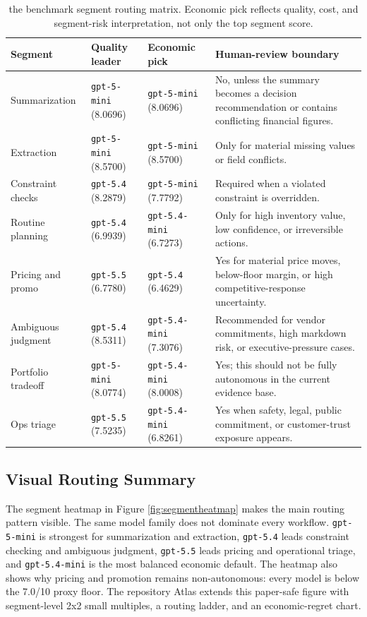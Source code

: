 \documentclass[11pt]{article}
\newcommand{\score}[1]{#1/10}
\newcommand{\code}[1]{\texttt{#1}}
\begin{document}
\begin{table}[t]
\centering
\small
\begin{tabularx}{\textwidth}{>{\raggedright\arraybackslash}p{} >{\raggedright\arraybackslash}p{} >{\raggedright\arraybackslash}p{} X}
\toprule
Segment & Quality leader & Economic pick & Human-review boundary \\
\midrule
Summarization & \code{gpt-5-mini} (8.0696) & \code{gpt-5-mini} (8.0696) & No, unless the summary becomes a decision recommendation or contains conflicting financial figures. \\
Extraction & \code{gpt-5-mini} (8.5700) & \code{gpt-5-mini} (8.5700) & Only for material missing values or field conflicts. \\
Constraint checks & \code{gpt-5.4} (8.2879) & \code{gpt-5-mini} (7.7792) & Required when a violated constraint is overridden. \\
Routine planning & \code{gpt-5.4} (6.9939) & \code{gpt-5.4-mini} (6.7273) & Only for high inventory value, low confidence, or irreversible actions. \\
Pricing and promo & \code{gpt-5.5} (6.7780) & \code{gpt-5.4} (6.4629) & Yes for material price moves, below-floor margin, or high competitive-response uncertainty. \\
Ambiguous judgment & \code{gpt-5.4} (8.5311) & \code{gpt-5.4-mini} (7.3076) & Recommended for vendor commitments, high markdown risk, or executive-pressure cases. \\
Portfolio tradeoff & \code{gpt-5-mini} (8.0774) & \code{gpt-5.4-mini} (8.0008) & Yes; this should not be fully autonomous in the current evidence base. \\
Ops triage & \code{gpt-5.5} (7.5235) & \code{gpt-5.4-mini} (6.8261) & Yes when safety, legal, public commitment, or customer-trust exposure appears. \\
\bottomrule
\end{tabularx}
\caption{the benchmark segment routing matrix. Economic pick reflects quality, cost, and segment-risk interpretation, not only the top segment score.}
\label{tab:segments}
\end{table}

\subsection{Visual Routing Summary}

The segment heatmap in Figure \ref{fig:segmentheatmap} makes the main routing pattern visible. The same model family does not dominate every workflow. \code{gpt-5-mini} is strongest for summarization and extraction, \code{gpt-5.4} leads constraint checking and ambiguous judgment, \code{gpt-5.5} leads pricing and operational triage, and \code{gpt-5.4-mini} is the most balanced economic default. The heatmap also shows why pricing and promotion remains non-autonomous: every model is below the \score{7.0} proxy floor. The repository Atlas extends this paper-safe figure with segment-level 2x2 small multiples, a routing ladder, and an economic-regret chart.
\end{document}
